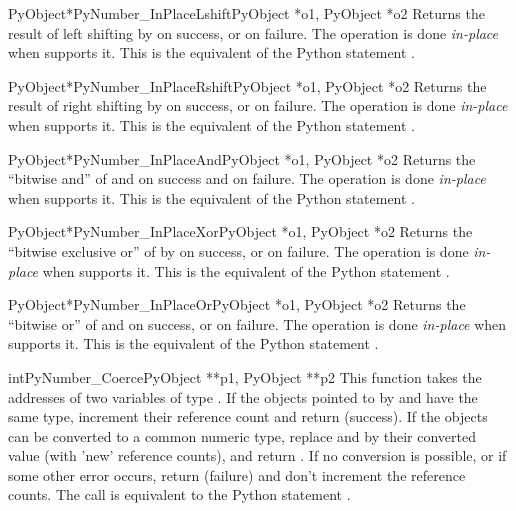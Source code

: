 \begin{cfuncdesc}{PyObject*}{PyNumber_InPlaceLshift}{PyObject *o1,
                                                     PyObject *o2}
  Returns the result of left shifting  by  on success,
  or \NULL{} on failure.  The operation is done \emph{in-place} when
   supports it.  This is the equivalent of the Python
  statement .
\end{cfuncdesc}


\begin{cfuncdesc}{PyObject*}{PyNumber_InPlaceRshift}{PyObject *o1,
                                                     PyObject *o2}
  Returns the result of right shifting  by  on
  success, or \NULL{} on failure.  The operation is done
  \emph{in-place} when  supports it.  This is the equivalent
  of the Python statement .
\end{cfuncdesc}


\begin{cfuncdesc}{PyObject*}{PyNumber_InPlaceAnd}{PyObject *o1, PyObject *o2}
  Returns the ``bitwise and'' of  and  on success and
  \NULL{} on failure. The operation is done \emph{in-place} when
   supports it.  This is the equivalent of the Python
  statement .
\end{cfuncdesc}


\begin{cfuncdesc}{PyObject*}{PyNumber_InPlaceXor}{PyObject *o1, PyObject *o2}
  Returns the ``bitwise exclusive or'' of  by  on
  success, or \NULL{} on failure.  The operation is done
  \emph{in-place} when  supports it.  This is the equivalent
  of the Python statement .
\end{cfuncdesc}

\begin{cfuncdesc}{PyObject*}{PyNumber_InPlaceOr}{PyObject *o1, PyObject *o2}
  Returns the ``bitwise or'' of  and  on success, or
  \NULL{} on failure.  The operation is done \emph{in-place} when
   supports it.  This is the equivalent of the Python
  statement .
\end{cfuncdesc}

\begin{cfuncdesc}{int}{PyNumber_Coerce}{PyObject **p1, PyObject **p2}
  This function takes the addresses of two variables of type
  .  If the objects pointed to by 
  and  have the same type, increment their reference
  count and return  (success). If the objects can be converted
  to a common numeric type, replace  and  by their
  converted value (with 'new' reference counts), and return .
  If no conversion is possible, or if some other error occurs, return
   (failure) and don't increment the reference counts.  The
  call  is equivalent to the Python
  statement .
\end{cfuncdesc}


